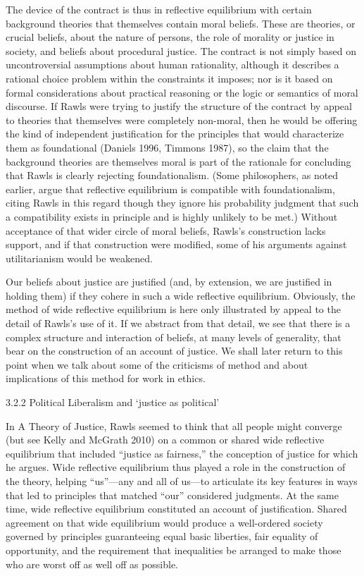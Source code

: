 \documentclass[]{article}
\begin{document}
The device of the contract is thus in reflective equilibrium with
certain background theories that themselves contain moral beliefs. These
are theories, or crucial beliefs, about the nature of persons, the role
of morality or justice in society, and beliefs about procedural justice.
The contract is not simply based on uncontroversial assumptions about
human rationality, although it describes a rational choice problem
within the constraints it imposes; nor is it based on formal
considerations about practical reasoning or the logic or semantics of
moral discourse. If Rawls were trying to justify the structure of the
contract by appeal to theories that themselves were completely
non-moral, then he would be offering the kind of independent
justification for the principles that would characterize them as
foundational (Daniels 1996, Timmons 1987), so the claim that the
background theories are themselves moral is part of the rationale for
concluding that Rawls is clearly rejecting foundationalism. (Some
philosophers, as noted earlier, argue that reflective equilibrium is
compatible with foundationalism, citing Rawls in this regard though they
ignore his probability judgment that such a compatibility exists in
principle and is highly unlikely to be met.) Without acceptance of that
wider circle of moral beliefs, Rawls's construction lacks support, and
if that construction were modified, some of his arguments against
utilitarianism would be weakened.

Our beliefs about justice are justified (and, by extension, we are
justified in holding them) if they cohere in such a wide reflective
equilibrium. Obviously, the method of wide reflective equilibrium is
here only illustrated by appeal to the detail of Rawls's use of it. If
we abstract from that detail, we see that there is a complex structure
and interaction of beliefs, at many levels of generality, that bear on
the construction of an account of justice. We shall later return to this
point when we talk about some of the criticisms of method and about
implications of this method for work in ethics.

3.2.2 Political Liberalism and `justice as political'

In A Theory of Justice, Rawls seemed to think that all people might
converge (but see Kelly and McGrath 2010) on a common or shared wide
reflective equilibrium that included ``justice as fairness,'' the
conception of justice for which he argues. Wide reflective equilibrium
thus played a role in the construction of the theory, helping
``us''---any and all of us---to articulate its key features in ways that
led to principles that matched ``our'' considered judgments. At the same
time, wide reflective equilibrium constituted an account of
justification. Shared agreement on that wide equilibrium would produce a
well-ordered society governed by principles guaranteeing equal basic
liberties, fair equality of opportunity, and the requirement that
inequalities be arranged to make those who are worst off as well off as
possible.
\end{document}
